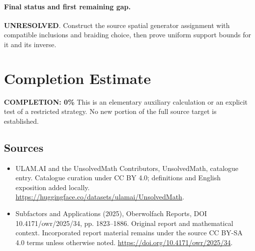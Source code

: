 \documentclass[11pt]{article}
\begin{document}
\paragraph{Final status and first remaining gap.}
\textbf{UNRESOLVED}. Construct the source spatial generator assignment with compatible inclusions and braiding choice, then prove uniform support bounds for it and its inverse.

\section{Completion Estimate}
\noindent\textbf{COMPLETION: 0\%}
This is an elementary auxiliary calculation or an explicit test of a restricted strategy. No new portion of the full source target is established.

\subsection{Sources}
\begin{itemize}
\item[\hypertarget{source:statement:1}{S1}] ULAM.AI and the UnsolvedMath Contributors, UnsolvedMath, catalogue entry. Catalogue curation under CC BY 4.0; definitions and English exposition added locally.
\url{https://huggingface.co/datasets/ulamai/UnsolvedMath}.
\item[\hypertarget{source:statement:2}{S2}] Subfactors and Applications (2025), Oberwolfach Reports, DOI 10.4171/owr/2025/34, pp. 1823--1886. Original report and mathematical context. Incorporated report material remains under the source CC BY-SA 4.0 terms unless otherwise noted.
\url{https://doi.org/10.4171/owr/2025/34}.
\end{itemize}
\label{end:statement}
\end{document}
